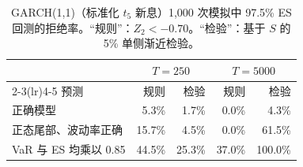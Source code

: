 \begin{table}[t]
\centering
\caption{GARCH(1,1)（标准化 $t_5$ 新息）1{,}000 次模拟中 97.5\% ES 回测的拒绝率。“规则”：$Z_2<-0.70$。“检验”：基于 $S$ 的 5\% 单侧渐近检验。}
\label{tab:z2mc}
\small
\begin{tabular}{lrrrr}
\toprule
 & \multicolumn{2}{c}{$T=250$} & \multicolumn{2}{c}{$T=5000$} \\ \cmidrule(lr){2-3}\cmidrule(lr){4-5}
预测 & 规则 & 检验 & 规则 & 检验 \\
\midrule
正确模型 & 5.3\% & 1.7\% & 0.0\% & 4.3\% \\
正态尾部、波动率正确 & 15.7\% & 4.5\% & 0.0\% & 61.5\% \\
VaR 与 ES 均乘以 0.85 & 44.5\% & 25.3\% & 37.0\% & 100.0\% \\
\bottomrule
\end{tabular}
\end{table}
